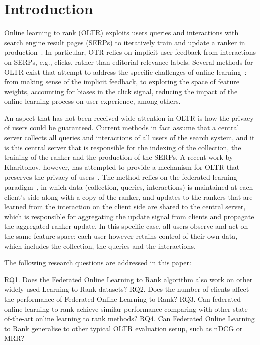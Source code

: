 \section{Introduction}

Online learning to rank (OLTR) exploits users queries and interactions with search engine result pages (SERPs) to iteratively train and update a ranker in  production~\cite{bibid}. In particular, OTR relies on implicit user feedback from interactions on SERPs, e.g., clicks, rather than editorial relevance labels. 
Several methods for OLTR exist that attempt to address the specific challenges of online learning~\cite{bibid}: from making sense of the implicit feedback, to exploring the space of feature weights, accounting for biases in the click signal, reducing the impact of the online learning process on user experience, among others. 

An aspect that has not been received wide attention in OLTR is how the privacy of users could be guaranteed. Current methods in fact assume that a central server collects all queries and interactions of all users of the search system, and it is this central server that is responsible for the indexing of the collection, the training of the ranker and the production of the SERPs. A recent work by Kharitonov, however, has attempted to provide a mechanism for OLTR that preserves the privacy of users~\cite{kharitonov2019federated}. The method relies on the federated learning paradigm~\cite{bibid}, in which data (collection, queries, interactions) is maintained at each client's side along with a copy of the ranker, and updates to the rankers that are learned from the interaction on the client side are shared to the central server, which is responsible for aggregating the update signal from clients and propagate the aggregated ranker update. In this specific case, all users observe and act on the same feature space; each user however retains control of their own data, which includes the collection, the queries and the interactions.  





The following research questions are addressed in this paper:

RQ1. Does the Federated Online Learning to Rank algorithm also work on other widely used Learning to Rank datasets?
RQ2. Does the number of clients affect the performance of Federated Online Learning to Rank?
RQ3. Can federated online learning to rank achieve similar performance comparing with other state-of-the-art online learning to rank methods?
RQ4. Can Federated Online Learning to Rank generalise to other typical OLTR evaluation setup, such as nDCG or MRR?
